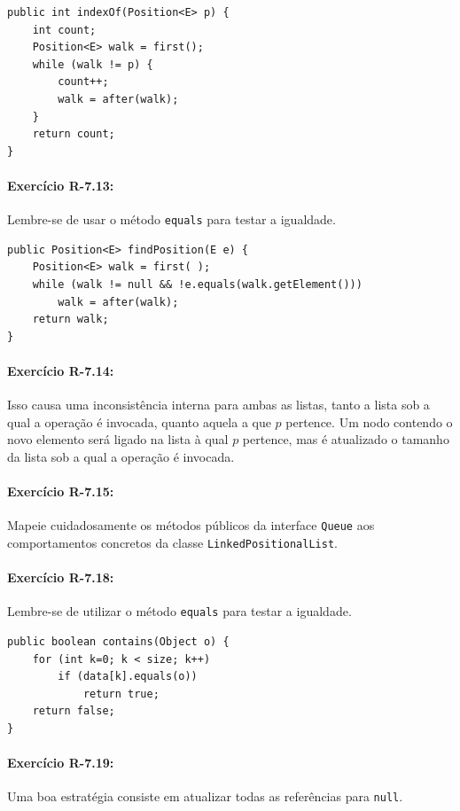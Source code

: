 \begin{lstlisting}[frame=single]
public int indexOf(Position<E> p) {
	int count;
	Position<E> walk = first();
	while (walk != p) {
		count++;
		walk = after(walk);
	}
	return count;
}
\end{lstlisting}

\paragraph{Exercício R-7.13:}
Lembre-se de usar o método \texttt{equals} para testar a igualdade.

\begin{lstlisting}[frame=single]
public Position<E> findPosition(E e) {
	Position<E> walk = first( );
	while (walk != null && !e.equals(walk.getElement()))
		walk = after(walk);
	return walk;
}
\end{lstlisting}

\paragraph{Exercício R-7.14:}
Isso causa uma inconsistência interna para ambas as listas, tanto a lista sob a qual a operação é invocada, quanto aquela a que $p$ pertence. Um nodo contendo o novo elemento será ligado na lista à qual $p$ pertence, mas é atualizado o tamanho da lista sob a qual a operação é invocada.

\paragraph{Exercício R-7.15:}
Mapeie cuidadosamente os métodos públicos da interface \texttt{Queue} aos comportamentos concretos da classe \texttt{LinkedPositionalList}.

\paragraph{Exercício R-7.18:}
Lembre-se de utilizar o método \texttt{equals} para testar a igualdade.

\begin{lstlisting}[frame=single]
public boolean contains(Object o) {
	for (int k=0; k < size; k++)
		if (data[k].equals(o))
			return true;
	return false;
}
\end{lstlisting}

\paragraph{Exercício R-7.19:}
Uma boa estratégia consiste em atualizar todas as referências para \texttt{null}.

